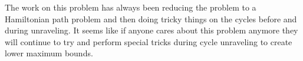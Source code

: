 \documentclass[letterpaper,11pt,titlepage]{article}
\begin{document}
The work on this problem has always been reducing the problem to a Hamiltonian path problem and then doing tricky things on the cycles before and during unraveling. It seems like if anyone cares about this problem anymore they will continue to try and perform special tricks during cycle unraveling to create lower maximum bounds.

\newpage

{
  \small 
  
  
}
\end{document}
